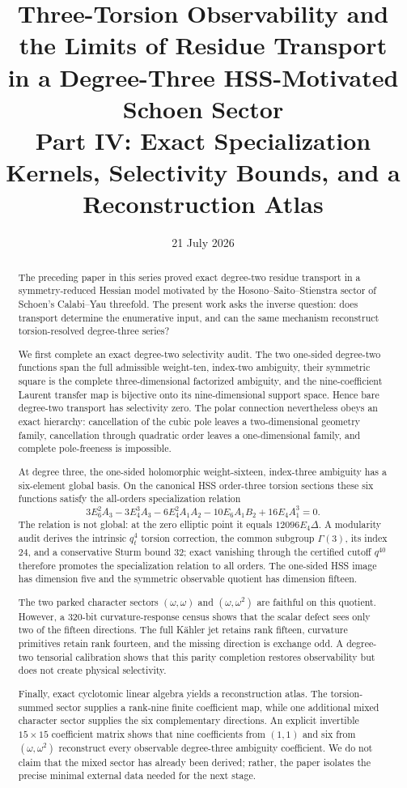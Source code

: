 \documentclass[11pt]{article}
\title{\textbf{Three-Torsion Observability and the Limits of Residue Transport\\in a Degree-Three HSS-Motivated Schoen Sector}\\[2mm]
\large Part IV: Exact Specialization Kernels, Selectivity Bounds, and a Reconstruction Atlas}
\author{}
\date{21 July 2026}
\theoremstyle{definition}
\theoremstyle{remark}
\begin{document}
\maketitle

\begin{abstract}
The preceding paper in this series proved exact degree-two residue transport in a symmetry-reduced Hessian model motivated by the Hosono--Saito--Stienstra sector of Schoen's Calabi--Yau threefold.  The present work asks the inverse question: does transport determine the enumerative input, and can the same mechanism reconstruct torsion-resolved degree-three series?

We first complete an exact degree-two selectivity audit.  The two one-sided degree-two functions span the full admissible weight-ten, index-two ambiguity, their symmetric square is the complete three-dimensional factorized ambiguity, and the nine-coefficient Laurent transfer map is bijective onto its nine-dimensional support space.  Hence bare degree-two transport has selectivity zero.  The polar connection nevertheless obeys an exact hierarchy: cancellation of the cubic pole leaves a two-dimensional geometry family, cancellation through quadratic order leaves a one-dimensional family, and complete pole-freeness is impossible.

At degree three, the one-sided holomorphic weight-sixteen, index-three ambiguity has a six-element global basis.  On the canonical HSS order-three torsion sections these six functions satisfy the all-orders specialization relation
\[
3E_6^2A_3-3E_4^3A_3-6E_4^2A_1A_2-10E_6A_1B_2+16E_4A_1^3=0.
\]
The relation is not global: at the zero elliptic point it equals $12096E_4\Delta$.  A modularity audit derives the intrinsic $q_t^4$ torsion correction, the common subgroup $\Gamma(3)$, its index $24$, and a conservative Sturm bound $32$; exact vanishing through the certified cutoff $q^{40}$ therefore promotes the specialization relation to all orders.  The one-sided HSS image has dimension five and the symmetric observable quotient has dimension fifteen.

The two parked character sectors $(\omega,\omega)$ and $(\omega,\omega^2)$ are faithful on this quotient.  However, a 320-bit curvature-response census shows that the scalar defect sees only two of the fifteen directions.  The full K\"ahler jet retains rank fifteen, curvature primitives retain rank fourteen, and the missing direction is exchange odd.  A degree-two tensorial calibration shows that this parity completion restores observability but does not create physical selectivity.

Finally, exact cyclotomic linear algebra yields a reconstruction atlas.  The torsion-summed sector supplies a rank-nine finite coefficient map, while one additional mixed character sector supplies the six complementary directions.  An explicit invertible $15\times15$ coefficient matrix shows that nine coefficients from $(1,1)$ and six from $(\omega,\omega^2)$ reconstruct every observable degree-three ambiguity coefficient.  We do not claim that the mixed sector has already been derived; rather, the paper isolates the precise minimal external data needed for the next stage.
\end{abstract}
\end{document}
